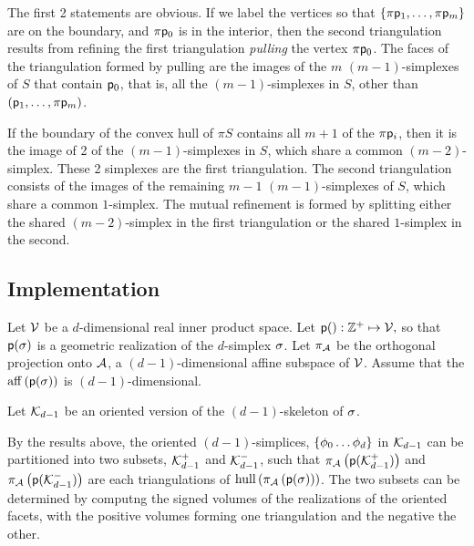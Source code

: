 The first 2 statements are obvious.
If we label the vertices so that $\{\pi \mathsf{p}_1, \ldots , \pi \mathsf{p}_m\}$
are on the boundary, and $\pi \mathsf{p}_0$ is in the interior,
then the second triangulation results from refining the first
triangulation {\it pulling}
\cite{Lee:2004:Subdivisions} the vertex $\pi \mathsf{p}_0$.
The faces of the triangulation formed by pulling
are the images of the $m$ $(m-1)$-simplexes
of $S$ that contain $\mathsf{p}_0$, that is, all the $(m-1)$-simplexes in $S$,
other than $(\mathsf{p}_1, \ldots , \pi \mathsf{p}_m)$.

\begin{Theorem}
\label{two-simplex-case}
If the boundary of the convex hull of $\pi S$
contains all $m+1$ of the $\pi \mathsf{p}_i$,
then it is the image of 2 of the $(m-1)$-simplexes in $S$,
which share a common $(m-2)$-simplex.
These 2 simplexes are the first triangulation.
The second triangulation consists of the images
of the remaining $m-1$ $(m-1)$-simplexes of $S$,
which share a common $1$-simplex.
The mutual refinement is formed by splitting either
the shared $(m-2)$-simplex in the first triangulation
or the shared $1$-simplex in the second.
\end{Theorem}

\subsection{Implementation}

Let $\mathcal{V}$ be a $d$-dimensional real inner product space.
Let $\mathsf{p}() : \mathbb{Z}^{+} \mapsto \mathcal{V},$
so that $\mathsf{p}(\sigma)$ is a geometric realization of the $d$-simplex $\sigma$.
Let $\pi_{\mathcal{A}}$ be the orthogonal projection onto
$\mathcal{A}$, a $(d-1)$-dimensional affine subspace of $\mathcal{V}$.
Assume that the $\affine_span \left( \p(\Ssimplex) \right)$
is $(d-1)$-dimensional.

Let $\mathcal{K}_{d-1}$ be an oriented version of the $(d-1)$-skeleton of $\sigma$.

By the results above, the oriented $(d-1)$-simplices,
$\{ \phi_0 \ldots \phi_d \}$ in $\mathcal{K}_{d-1}$
can be partitioned into two subsets, $\mathcal{K}_{d-1}^{+}$
and $\mathcal{K}_{d-1}^{-}$, such that
$\pi_{\mathcal{A}} \left( \mathsf{p} ( \mathcal{K}_{d-1}^{+} ) \right)$
and
$\pi_{\mathcal{A}} \left( \mathsf{p} ( \mathcal{K}_{d-1}^{-} ) \right)$
are each triangulations of
$\convex_span \left( \Projection_{\Aspace} \left( \p ( \Ssimplex ) \right) \right)$.
The two subsets can be determined by computng the signed
volumes of the realizations of the oriented facets,
with the positive volumes forming one triangulation and the negative the other.

